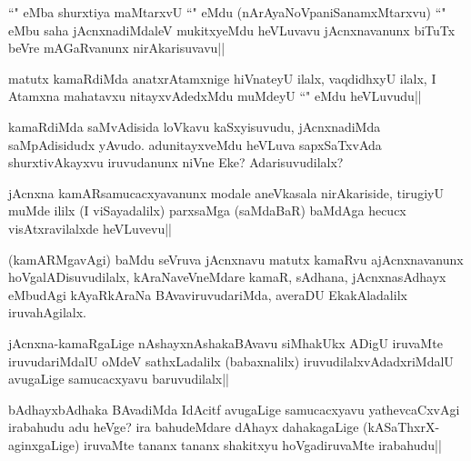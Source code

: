 
\begin{artha}
``\stext" eMba shurxtiya maMtarxvU ``\stext" eMdu (nArAyaNoVpaniSanamxMtarxvu) ``\stext" eMbu saha jAcnxnadiMdaleV mukitxyeMdu heVLuvavu jAcnxnavanunx biTuTx beVre mAGaRvanunx nirAkarisuvavu||
\end{artha}


\begin{artha}
matutx kamaRdiMda anatxrAtamxnige hiVnateyU ilalx, vaqdidhxyU ilalx, I Atamxna mahatavxu nitayxvAdedxMdu muMdeyU ``\stext" eMdu heVLuvudu||
\end{artha}


\begin{artha}
kamaRdiMda saMvAdisida loVkavu kaSxyisuvudu, jAcnxnadiMda saMpAdisidudx yAvudo. 
adunitayxveMdu heVLuva sapxSaTxvAda shurxtivAkayxvu iruvudanunx niVne Eke? Adarisuvudilalx?
\end{artha}

\begin{artha}
jAcnxna kamARsamucacxyavanunx  modale aneVkasala nirAkariside, tirugiyU muMde ililx (I viSayadalilx) parxsaMga (saMdaBaR) baMdAga hecucx visAtxravilalxde heVLuvevu||
\end{artha}


\begin{artha}
(kamARMgavAgi) baMdu seVruva jAcnxnavu matutx kamaRvu ajAcnxnavanunx hoVgalADisuvudilalx, kAraNaveVneMdare kamaR, sAdhana, jAcnxnasAdhayx eMbudAgi kAyaRkAraNa BAvaviruvudariMda, averaDU EkakAladalilx iruvahAgilalx.
\end{artha}



\begin{artha}
jAcnxna-kamaRgaLige nAshayxnAshakaBAvavu siMhakUkx ADigU iruvaMte iruvudariMdalU oMdeV sathxLadalilx (babaxnalilx) iruvudilalxvAdadxriMdalU avugaLige samucacxyavu baruvudilalx||
\end{artha}

\begin{artha}
bAdhayxbAdhaka BAvadiMda IdAcitf avugaLige samucacxyavu yathevcaCxvAgi irabahudu adu heVge? ira bahudeMdare dAhayx dahakagaLige (kASaThxrX-aginxgaLige) iruvaMte tananx tananx shakitxyu hoVgadiruvaMte irabahudu||
\end{artha}

